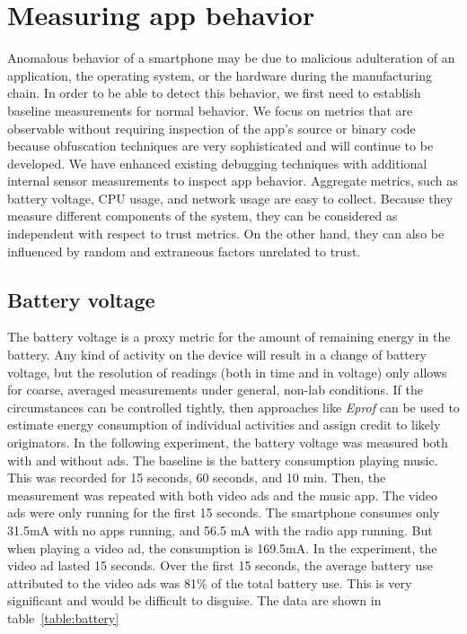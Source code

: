 \section{Measuring app behavior}

Anomalous behavior of a smartphone may be due to malicious adulteration of an application,
the operating system, or the hardware during the manufacturing chain.
In order to be able to detect this
behavior, we first need to establish baseline measurements for 
normal behavior. We focus on metrics that are observable 
without requiring inspection of the app's source or binary code
because obfuscation techniques are very sophisticated and will continue to be developed.
We have enhanced existing debugging techniques with additional internal sensor measurements to inspect app behavior.
Aggregate metrics, such as battery voltage, CPU usage, and network usage are easy to collect.  
Because they measure different components of the system, they can be considered as independent with
respect to trust metrics.  On the other hand,
they can also be influenced by random and extraneous factors unrelated to trust.

\subsection{Battery voltage}
The battery voltage is a proxy metric for the amount of remaining 
energy in the battery. Any kind of activity on the device will result 
in a change of battery voltage, but the resolution of readings (both 
in time and in voltage) only allows for coarse, averaged measurements 
under general, non-lab conditions.
If the circumstances can be controlled tightly, then approaches like 
\textit{Eprof} \cite{pathak2012fine} can be used to estimate energy consumption 
of individual activities and assign credit to likely originators.  In the following experiment,
the battery voltage was measured both with and without ads.
The ​baseline is the battery consumption playing  music.
This was recorded for 15 seconds, 60 seconds, and 10 min.  Then, the measurement was repeated
with both video ads and the music app.  The video ads were only running for the first 15 seconds.
The smartphone consumes only 31.5mA with no apps running, and 56.5 mA with the radio app
running.
But when playing a video ad, the consumption is 169.5mA. 
In the experiment, the video ad lasted 15 seconds.
Over the first 15 seconds, the average battery use attributed to the video ads was 81\% of the total
battery use.  This is very significant and would be difficult to disguise.
The data are shown in table~\ref{table:battery}




